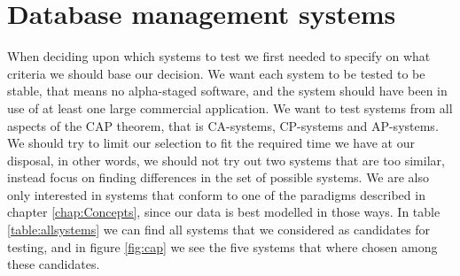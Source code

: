 \section{Database management systems}
When deciding upon which systems to test we first needed to specify on what criteria we should base our decision. We want each system to be tested to be stable, that means no alpha-staged software, and the system should have been in use of at least one large commercial application. We want to test systems from all aspects of the CAP theorem, that is CA-systems, CP-systems and AP-systems. We should try to limit our selection to fit the required time we have at our disposal, in other words, we should not try out two systems that are too similar, instead focus on finding differences in the set of possible systems. We are also only interested in systems that conform to one of the paradigms described in chapter \ref{chap:Concepts}, since our data is best modelled in those ways. In table \ref{table:allsystems} we can find all systems that we considered as candidates for testing, and in figure \ref{fig:cap} we see the five systems that where chosen among these candidates.

